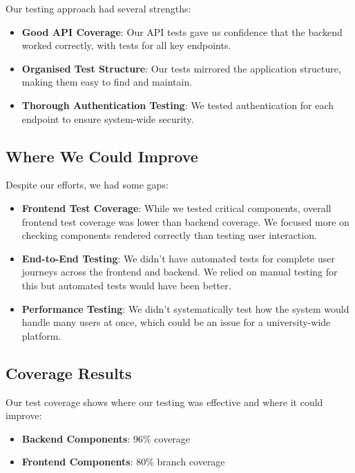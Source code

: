 Our testing approach had several strengths:

\begin{itemize}
    \item \textbf{Good API Coverage}: Our API tests gave us confidence that the backend worked correctly, with tests for all key endpoints.
    
    \item \textbf{Organised Test Structure}: Our tests mirrored the application structure, making them easy to find and maintain.
    
    \item \textbf{Thorough Authentication Testing}: We tested authentication for each endpoint to ensure system-wide security.
\end{itemize}

\subsection{Where We Could Improve}

Despite our efforts, we had some gaps:

\begin{itemize}
    \item \textbf{Frontend Test Coverage}: While we tested critical components, overall frontend test coverage was lower than backend coverage. We focused more on checking components rendered correctly than testing user interaction.
    
    \item \textbf{End-to-End Testing}: We didn't have automated tests for complete user journeys across the frontend and backend. We relied on manual testing for this but automated tests would have been better.
    
    \item \textbf{Performance Testing}: We didn't systematically test how the system would handle many users at once, which could be an issue for a university-wide platform.
\end{itemize}

\subsection{Coverage Results}

Our test coverage shows where our testing was effective and where it could improve:
 
\begin{itemize}
    \item \textbf{Backend Components}: 96\% coverage
    \item \textbf{Frontend Components}: 80\% branch coverage
\end{itemize}

